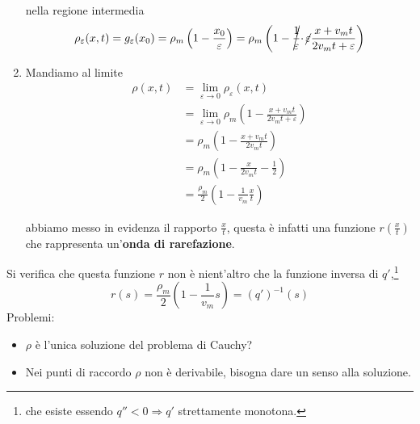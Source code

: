 \documentclass[10pt,a4paper,twoside,openright]{book}
\begin{document}
\begin{enumerate}
	      
	      nella regione intermedia
	      \begin{equation*}
	      	\rho _{\varepsilon }( x,t) =g_{\varepsilon }( x_{0}) =\rho _{m}\left( 1-\frac{x_{0}}{\varepsilon }\right) =\rho _{m}\left( 1-\cancel{\frac{1}{\varepsilon }} \cdotp \cancel{\varepsilon }\frac{x+v_{m} t}{2v_{m} t+\varepsilon }\right)
	      \end{equation*}
	\item Mandiamo al limite
	      \begin{align*}
	      	\rho ( x,t) & =\lim _{\varepsilon \rightarrow 0} \rho _{\varepsilon }( x,t)                                       \\
	      	            & =\lim _{\varepsilon \rightarrow 0} \rho _{m}\left( 1-\frac{x+v_{m} t}{2v_{m} t+\varepsilon }\right) \\
	      	            & =\rho _{m}\left( 1-\frac{x+v_{m} t}{2v_{m} t}\right)                                                \\
	      	            & =\rho _{m}\left( 1-\frac{x}{2v_{m} t} -\frac{1}{2}\right)                                           \\
	      	            & =\frac{\rho _{m}}{2}\left( 1-\frac{1}{v_{m}}\frac{x}{t}\right)                                      
	      \end{align*}
	      
	      abbiamo messo in evidenza il rapporto $\frac{x}{t}$, questa è infatti una funzione $r\left(\frac{x}{t}\right)$ che rappresenta un'\textbf{onda di rarefazione}.
\end{enumerate}


Si verifica che questa funzione $r$ non è nient'altro che la funzione inversa di $q'$,\footnote{che esiste essendo $q''< 0\Rightarrow q'$ strettamente monotona.}
\begin{equation*}
	r( s) =\frac{\rho _{m}}{2}\left( 1-\frac{1}{v_{m}} s\right) =( q')^{-1}( s)
\end{equation*}
Problemi:
\begin{itemize}
	\item $\rho $ è l'unica soluzione del problema di Cauchy?
	\item Nei punti di raccordo $\rho $ non è derivabile, bisogna dare un senso alla soluzione.
\end{itemize}
\end{document}
